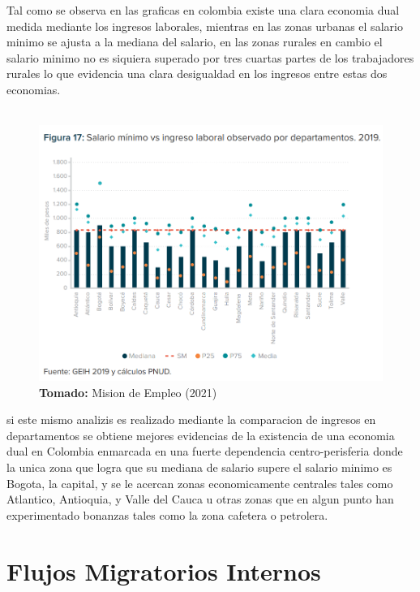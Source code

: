 \documentclass[12pt,letterpaper]{book}
\newcommand*{\captionsource}[2]{%
    \textbf{\\Tomado:} #2%
  }%
\begin{document}
\begin{flushleft}
Tal como se observa en las graficas en colombia existe una clara economia dual medida mediante los ingresos laborales, mientras en las zonas urbanas el salario minimo se ajusta a la mediana del salario,
en las zonas rurales en cambio el salario minimo no es siquiera superado por tres cuartas partes de los trabajadores rurales lo que evidencia una clara desigualdad en los ingresos entre estas dos economias.\\
~\\
\begin{figure}
    \centering
    \includegraphics[width=\linewidth]{ingdepto.png}
    \captionsource{Caption}{Mision de Empleo (2021)}
\end{figure}

si este mismo analizis es realizado mediante la comparacion de ingresos en departamentos se obtiene mejores evidencias de la existencia de una economia dual en Colombia enmarcada en una fuerte dependencia
centro-perisferia donde la unica zona que logra que su mediana de salario supere el salario minimo es Bogota, la capital, y se le acercan zonas economicamente centrales tales como Atlantico, Antioquia, y Valle del Cauca u otras zonas que en algun punto
han experimentado bonanzas tales como la zona cafetera o petrolera.\\
\end{flushleft}

\section{Flujos Migratorios Internos}
\end{document}
